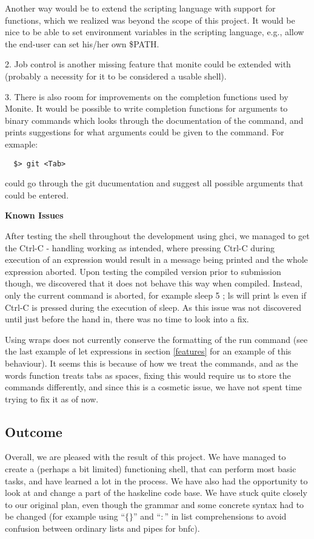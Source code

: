 \documentclass[11pt,a4paper]{article}
\begin{document}
Another way would be to extend the scripting language with support for
functions, which we realized was beyond the scope of this project. It would be
nice to be able to set environment variables in the scripting language, e.g.,
allow the end-user can set his/her own \$PATH.

2. Job control is another missing feature that monite could be extended with
(probably a necessity for it to be considered a usable shell).

3. There is also room for improvements on the completion functions used by
Monite.  It would be possible to write completion functions for arguments to
binary commands which looks through the documentation of the command, and prints
suggestions for what arguments could be given to the command. For exmaple:

\begin{verbatim}
  $> git <Tab>
\end{verbatim}

could go through the git ducumentation and suggest all possible arguments that
could be entered.

\textbf{Known Issues}

After testing the shell throughout the development using ghci, we managed to
get the Ctrl-C - handling working as intended, where pressing Ctrl-C during
execution of an expression would result in a message being printed and the
whole expression aborted. Upon testing the compiled version prior to submission
though, we discovered that it does not behave this way when compiled. Instead,
only the current command is aborted, for example sleep 5 ; ls will print ls
even if Ctrl-C is pressed during the execution of sleep. As this issue was not
discovered until just before the hand in, there was no time to look into a fix.

Using wraps does not currently conserve the formatting of the run command (see
the last example of let expressions in section \ref{features} for an example of
this behaviour). It seems this is because of how we treat the commands, and as
the words function treats tabs as spaces, fixing this would require us to store
the commands differently, and since this is a cosmetic issue, we have not spent
time trying to fix it as of now.

\subsection{Outcome}

Overall, we are pleased with the result of this project. We have managed to
create a (perhaps a bit limited) functioning shell, that can perform most basic
tasks, and have learned a lot in the process. We have also had the opportunity
to look at and change a part of the haskeline code base. We have stuck quite
closely to our original plan, even though the grammar and some concrete syntax
had to be changed (for example using ``$\{\}$'' and ``$:$'' in list comprehensions
to avoid confusion between ordinary lists and pipes for bnfc).
\end{document}
